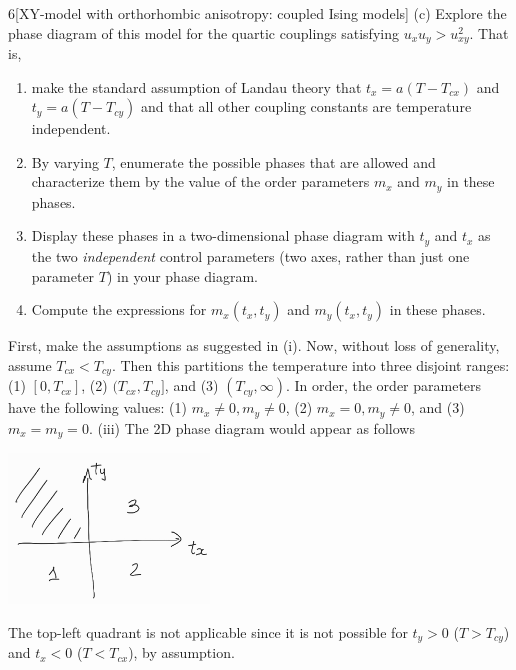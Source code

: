 \documentclass[12pt]{article}
\begin{document}
\begin{problem}{6}[XY-model with orthorhombic anisotropy: coupled Ising models]
(c) Explore the phase diagram of this model for the quartic couplings satisfying
$u_xu_y>u_{xy}^2$. That is,

\begin{enumerate}[label=(\roman*)]
    \item make the standard assumption of Landau theory that $t_x=a(T-T_{cx})$
        and $t_y=a(T-T_{cy})$ and that all other coupling constants are
        temperature independent. 
    \item By varying $T$, enumerate the possible phases that are allowed and
        characterize them by the value of the order parameters $m_x$ and $m_y$
        in these phases.
    \item Display these phases in a two-dimensional phase diagram with $t_y$ and
        $t_x$ as the two \textit{independent} control parameters (two axes,
        rather than just one parameter $T$) in your phase diagram.
    \item Compute the expressions for $m_x(t_x,t_y)$ and $m_y(t_x,t_y)$ in these
        phases.
\end{enumerate}

\begin{solution}
First, make the assumptions as suggested in (i). Now, without loss of
generality, assume $T_{cx}<T_{cy}$. Then this partitions the temperature into
three disjoint ranges: (1) $[0, T_{cx}]$, (2) $(T_{cx},T_{cy}]$, and (3)
$(T_{cy},\infty)$. In order, the order parameters have the following values:
(1) $m_x\neq0,m_y\neq0$, (2) $m_x=0,m_y\neq0$, and (3) $m_x=m_y=0$. (iii) The 
2D phase diagram would appear as follows
\begin{center}
    \includegraphics[width=0.4\textwidth]{p6.jpg} 
\end{center}
The top-left quadrant is not applicable since it is not possible for $t_y>0$
($T>T_{cy}$) and $t_x<0$ ($T<T_{cx}$), by assumption.


\end{solution}
\end{problem}
\end{document}
